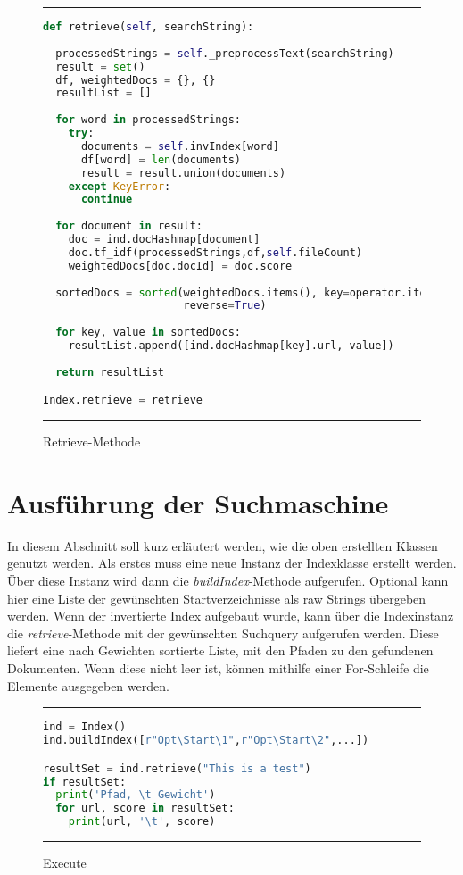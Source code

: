 \begin{figure}
	\rule{\textwidth}{0.4pt}
		\begin{lstlisting}[language=Python]
def retrieve(self, searchString):
 
  processedStrings = self._preprocessText(searchString)
  result = set()
  df, weightedDocs = {}, {}
  resultList = []
    
  for word in processedStrings:
    try:
      documents = self.invIndex[word]
      df[word] = len(documents)
      result = result.union(documents)
    except KeyError:
      continue
    
  for document in result:
    doc = ind.docHashmap[document]
    doc.tf_idf(processedStrings,df,self.fileCount)
    weightedDocs[doc.docId] = doc.score
        
  sortedDocs = sorted(weightedDocs.items(), key=operator.itemgetter(1),
                      reverse=True)
    
  for key, value in sortedDocs:
    resultList.append([ind.docHashmap[key].url, value])
        
  return resultList

Index.retrieve = retrieve
		\end{lstlisting}
	\rule{\textwidth}{0.4pt}
	\caption{Retrieve-Methode}
	\label{fig:retrieve}
\end{figure}

\section{Ausführung der Suchmaschine}

In diesem Abschnitt soll kurz erläutert werden, wie die oben erstellten Klassen genutzt werden. Als erstes muss eine neue Instanz der Indexklasse erstellt werden. Über diese Instanz wird dann die \textit{buildIndex}-Methode aufgerufen. Optional kann hier eine Liste der gewünschten Startverzeichnisse als raw Strings übergeben werden. Wenn der invertierte Index aufgebaut wurde, kann über die Indexinstanz die \textit{retrieve}-Methode mit der gewünschten Suchquery aufgerufen werden. Diese liefert eine nach Gewichten sortierte Liste, mit den Pfaden zu den gefundenen Dokumenten. Wenn diese nicht leer ist, können mithilfe einer For-Schleife die Elemente ausgegeben werden.

\begin{figure}
	\rule{\textwidth}{0.4pt}
		\begin{lstlisting}[language=Python]
ind = Index()
ind.buildIndex([r"Opt\Start\1",r"Opt\Start\2",...])

resultSet = ind.retrieve("This is a test")
if resultSet:
  print('Pfad, \t Gewicht')
  for url, score in resultSet:
    print(url, '\t', score)
		\end{lstlisting}
	\rule{\textwidth}{0.4pt}
	\caption{Execute}
	\label{fig:execute}
\end{figure}